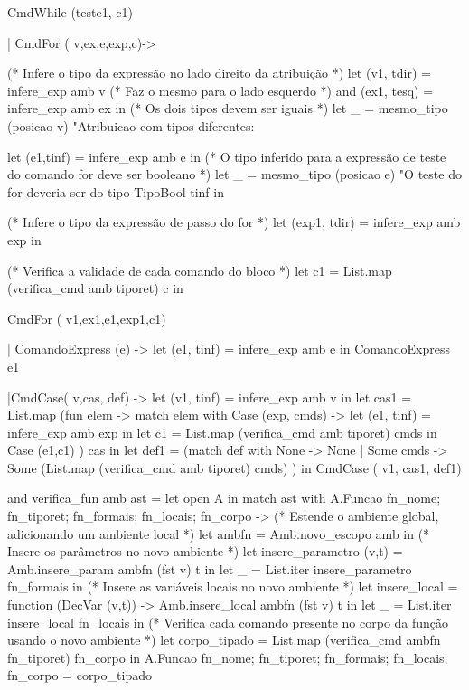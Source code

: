 \documentclass[12pt,a4paper,twoside]{article}
\begin{document}
\begin{terminal}
     CmdWhile (teste1, c1)

  | CmdFor ( v,ex,e,exp,c)->

    (* Infere o tipo da expressão no lado direito da atribuição *)
    let (v1,  tdir) = infere_exp amb v
    (* Faz o mesmo para o lado esquerdo *)
    and (ex1, tesq) = infere_exp amb ex in
    (* Os dois tipos devem ser iguais *)
    let _ = mesmo_tipo (posicao v)
                       "Atribuicao com tipos diferentes: %

    let (e1,tinf) = infere_exp amb e in
    (* O tipo inferido para a expressão de teste do comando for deve ser booleano *)
    let _ = mesmo_tipo (posicao e)
             "O teste do for deveria ser do tipo %
             TipoBool tinf in

    (* Infere o tipo da expressão de passo do for *)
    let (exp1,  tdir) = infere_exp amb exp in

    (* Verifica a validade de cada comando do bloco  *)
    let c1 = List.map (verifica_cmd amb tiporet) c in
    
     CmdFor ( v1,ex1,e1,exp1,c1)

  | ComandoExpress (e) ->  let (e1,  tinf) = infere_exp amb e in ComandoExpress e1

  |CmdCase( v,cas, def) ->
    let (v1,  tinf) = infere_exp amb v in
    let cas1 = List.map (fun elem ->
    match elem with 
    Case (exp, cmds) -> 
      let (e1,  tinf) = infere_exp amb exp
      in 
      let c1 = List.map (verifica_cmd amb tiporet) cmds in
      Case (e1,c1)
    ) cas in 
    let def1 = (match def with
      None -> None
    | Some cmds -> Some (List.map (verifica_cmd amb tiporet) cmds) 
    ) in
    CmdCase ( v1, cas1, def1)

and verifica_fun amb ast =
  let open A in
  match ast with
    A.Funcao {fn_nome; fn_tiporet; fn_formais; fn_locais; fn_corpo} ->
    (* Estende o ambiente global, adicionando um ambiente local *)
    let ambfn = Amb.novo_escopo amb in
    (* Insere os parâmetros no novo ambiente *)
    let insere_parametro (v,t) = Amb.insere_param ambfn (fst v) t in
    let _ = List.iter insere_parametro fn_formais in
    (* Insere as variáveis locais no novo ambiente *)
    let insere_local = function
        (DecVar (v,t)) -> Amb.insere_local ambfn (fst v)  t in
    let _ = List.iter insere_local fn_locais in
    (* Verifica cada comando presente no corpo da função usando o novo ambiente *)
    let corpo_tipado = List.map (verifica_cmd ambfn fn_tiporet) fn_corpo in
      A.Funcao {fn_nome; fn_tiporet; fn_formais; fn_locais; fn_corpo = corpo_tipado}



\end{terminal}
\end{document}
